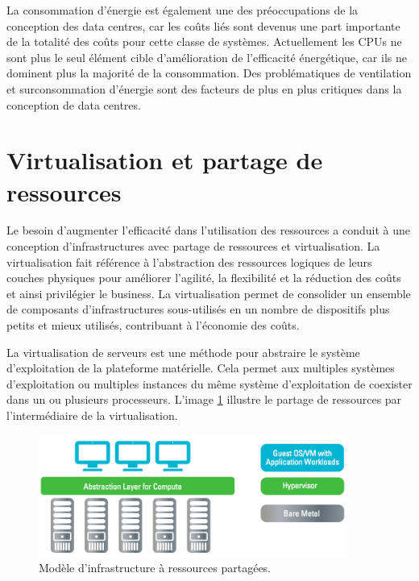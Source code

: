 La consommation d'énergie est également une des préoccupations de la conception des data centres, car les coûts liés sont devenus une part importante de la totalité des coûts pour cette classe de systèmes. Actuellement les CPUs ne sont plus le seul élément cible d'amélioration de l'efficacité énergétique, car ils ne dominent plus la majorité de la consommation. Des problématiques de ventilation et surconsommation d'énergie sont des facteurs de plus en plus critiques dans la conception de data centres.\cite{datacenterAsComputerIntro} \cite{dataCenterEvolution}

\section{Virtualisation et partage de ressources}

Le besoin d'augmenter l'efficacité dans l'utilisation des ressources a conduit à une conception d'infrastructures avec partage de ressources et virtualisation. La virtualisation fait référence à l'abstraction des ressources logiques de leurs couches physiques pour améliorer l'agilité, la flexibilité et la réduction des coûts et ainsi privilégier le business. La virtualisation permet de consolider un ensemble de composants d'infrastructures sous-utilisés en un nombre de dispositifs plus petits et mieux utilisés, contribuant à l'économie des coûts.

La virtualisation de serveurs est une méthode pour abstraire le système d'exploitation de la plateforme matérielle. Cela permet aux multiples systèmes d'exploitation ou multiples instances du même système d'exploitation de coexister dans un ou plusieurs processeurs. L'image \ref{virtinfra} illustre le partage de ressources par l'intermédiaire de la virtualisation.\\

\begin{figure}[h]
\begin{center}
\includegraphics[width=0.9\textwidth]{images/shared_infa_virt} 
\caption{Modèle d'infrastructure à ressources partagées. \cite{journeySDDC}}\label{virtinfra}
\end{center}
\end{figure}

